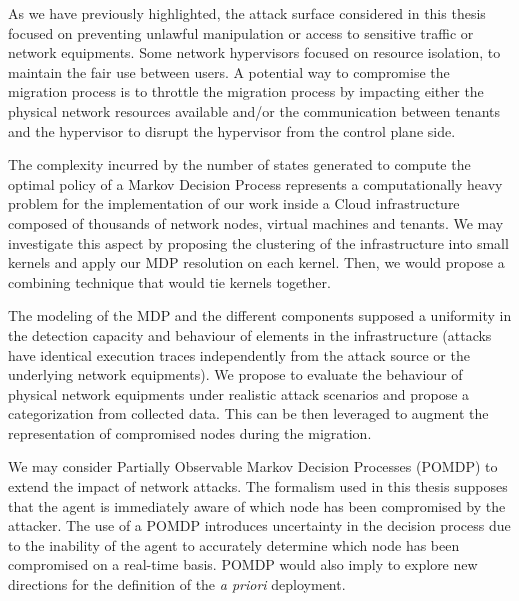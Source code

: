 As we have previously highlighted, the attack surface considered in this thesis focused on preventing unlawful manipulation or access to sensitive traffic or network equipments. Some network hypervisors focused on resource isolation, to maintain the fair use between users. A potential way to compromise the migration process is to throttle the migration process by impacting either the physical network resources available and/or the communication between tenants and the hypervisor to disrupt the hypervisor from the control plane side.

The complexity incurred by the number of states generated to compute the optimal policy of a Markov Decision Process represents a computationally heavy problem for the implementation of our work inside a Cloud infrastructure composed of thousands of network nodes, virtual machines and tenants. We may investigate this aspect by proposing the clustering of the infrastructure into small kernels and apply our MDP resolution on each kernel. Then, we would propose a combining technique that would tie kernels together.

The modeling of the MDP and the different components supposed a uniformity in the detection capacity and behaviour of elements in the infrastructure (\eg attacks have identical execution traces independently from the attack source or the underlying network equipments). We propose to evaluate the behaviour of physical network equipments under realistic attack scenarios and propose a categorization from collected data. This can be then leveraged to augment the representation of compromised nodes during the migration.

We may consider Partially Observable Markov Decision Processes (POMDP) to extend the impact of network attacks.
The formalism used in this thesis supposes that the agent is immediately aware of which node has been compromised by the attacker. The use of a POMDP introduces uncertainty in the decision process due to the inability of the agent to accurately determine which node has been compromised on a real-time basis. POMDP would also imply to explore new directions for the definition of the \textit{a priori} deployment.



